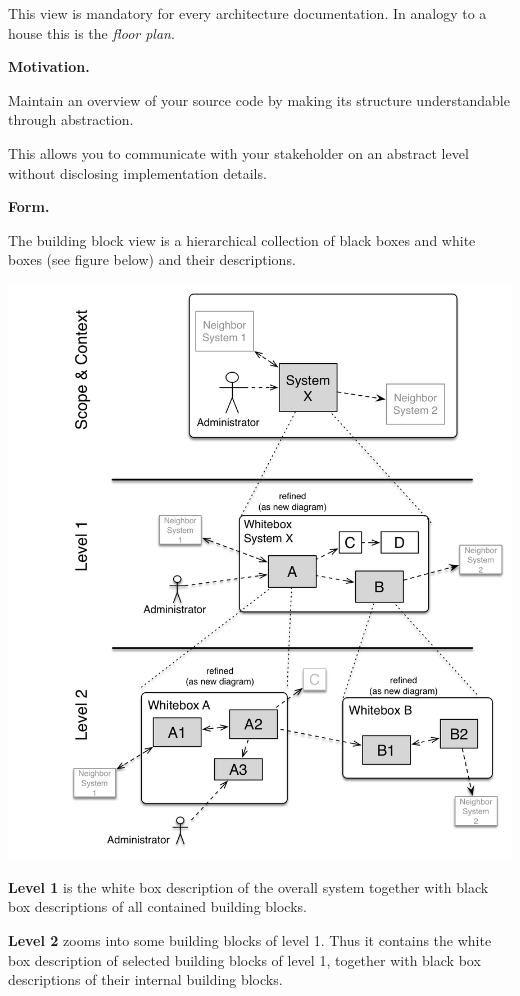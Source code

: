 \documentclass[]{article}
\begin{document}
This view is mandatory for every architecture documentation. In analogy
to a house this is the \emph{floor plan}.

\textbf{Motivation.}

Maintain an overview of your source code by making its structure
understandable through abstraction.

This allows you to communicate with your stakeholder on an abstract
level without disclosing implementation details.

\textbf{Form.}

The building block view is a hierarchical collection of black boxes and
white boxes (see figure below) and their descriptions.

\includegraphics{images/05_building_blocks-EN.png}

\textbf{Level 1} is the white box description of the overall system
together with black box descriptions of all contained building blocks.

\textbf{Level 2} zooms into some building blocks of level 1. Thus it
contains the white box description of selected building blocks of level
1, together with black box descriptions of their internal building
blocks.
\end{document}
